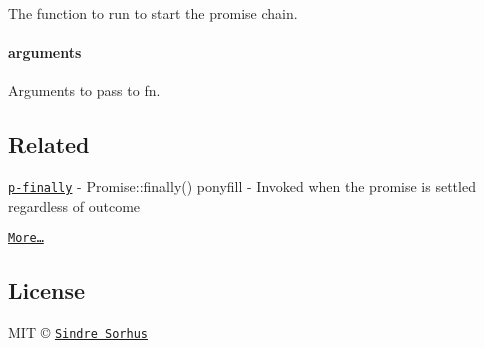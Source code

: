 The function to run to start the promise chain.

\paragraph*{arguments}

Arguments to pass to {\ttfamily fn}.

\subsection*{Related}


\begin{DoxyItemize}
\item \href{https://github.com/sindresorhus/p-finally}{\tt p-\/finally} -\/ {\ttfamily Promise\+::finally()} ponyfill -\/ Invoked when the promise is settled regardless of outcome
\item \href{https://github.com/sindresorhus/promise-fun}{\tt More…}
\end{DoxyItemize}

\subsection*{License}

M\+IT © \href{https://sindresorhus.com}{\tt Sindre Sorhus} 